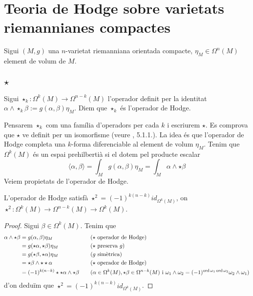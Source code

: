 \section{Teoria de Hodge sobre varietats riemannianes compactes}
Sigui $(M,g)$ una $n$-varietat riemanniana orientada compacte, $\eta_{M}\in\Omega^{n}(M)$ element de volum de $M$.
\subsection{$\star$}
\begin{definicio}
    Sigui $\star_{k}:\Omega^{k}(M)\rightarrow\Omega^{n-k}(M)$ l'operador definit per la identitat $\alpha\wedge\star_{k}\beta:=g(\alpha,\beta)\eta_{M}$. Diem que $\star_{k}$ és l'operador de Hodge. 
\end{definicio}
Pensarem $\star_{k}$ com una família d'operadors per cada $k$ i escriurem $\star$. Es comprova que $\star$ ve definit per un isomorfisme (veure \cite{Voisin_2002}, 5.1.1.). La idea és que l'operador de Hodge completa una $k$-forma diferenciable al element de volum $\eta_{M}$. Tenim que $\Omega^{k}(M)$ és un espai prehilbertià si el dotem pel producte escalar
\begin{equation*}
    \langle\alpha,\beta\rangle
    =\int_{M}g(\alpha,\beta)\eta_{M}
    =\int_{M}\alpha\wedge\star\beta
\end{equation*}
Veiem propietats de l'operador de Hodge.
\begin{lema}
   L'operador de Hodge satisfà $\star^{2}=(-1)^{k(n-k)}id_{\Omega^{k}(M)}$, on $\star^{2}:\Omega^{k}(M)\rightarrow\Omega^{n-k}(M)\rightarrow\Omega^{k}(M)$.
    \begin{proof}
        Sigui $\beta\in\Omega^{k}(M)$. Tenim que
        \begin{align*}
            \alpha\wedge\star\beta
            &=g(\alpha,\beta)\eta_{M}
            &\quad&\textrm{($\star$ operador de Hodge)}\\
            &=g(\star\alpha,\star\beta)\eta_{M}
            &\quad&\textrm{($\star$ preserva $g$)}\\
            &=g(\star\beta,\star\alpha)\eta_{M}
            &\quad&\textrm{($g$ simètrica)}\\
            &=\star\beta\wedge\star\star\alpha
            &\quad&\textrm{($\star$ operador de Hodge)}\\
            &=(-1)^{k(n-k)}\star\star\alpha\wedge\star\beta
            &\quad&\textrm{($\alpha\in\Omega^{k}(M),\star\beta\in\Omega^{n-k}(M)$ i $\omega_{1}\wedge\omega_{2}=(-1)^{\operatorname{ord}{\omega_{1}}\operatorname{ord}{\omega_{2}}}\omega_{2}\wedge\omega_{1}$)}
        \end{align*}
        d'on deduïm que $\star^{2}=(-1)^{k(n-k)}id_{\Omega^{k}(M)}$.
    \end{proof}
\end{lema}
